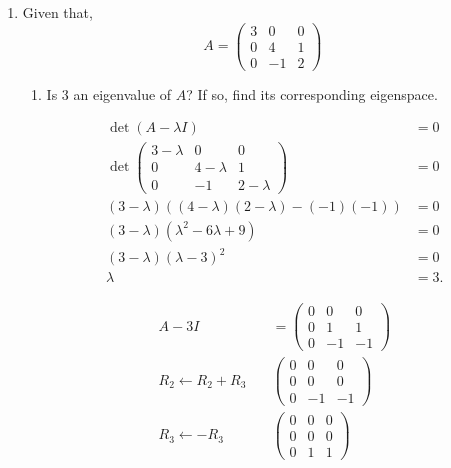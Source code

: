 \documentclass{zc-ust-hw}
\begin{document}
\maketitle

\begin{enumerate}
  \item Given that,
    \[
      A=\begin{pmatrix} 3&0&0\\0&4&1\\0&-1&2 \end{pmatrix} 
    \] 
    \begin{enumerate}
      \item Is 3 an eigenvalue of \( A \)? If so, find its corresponding eigenspace.  
        \begin{sol}
          \begin{align}
            \det(A - \lambda I) &= 0 \\
            \det\begin{pmatrix} 3-\lambda & 0 & 0 \\ 0 & 4-\lambda & 1 \\ 0 & -1 & 2-\lambda \end{pmatrix} &= 0 \\
            (3-\lambda)((4-\lambda)(2-\lambda) - (-1)(-1)) &= 0 \\
            (3-\lambda)(\lambda^2 - 6\lambda + 9) &= 0 \\
            (3-\lambda)(\lambda - 3)^2 &= 0 \\
            \lambda &= 3
          .\end{align}
          \end{sol}
          \begin{sol}
          \begin{align}
            A - 3I &= \begin{pmatrix} 0 & 0 & 0 \\ 0 & 1 & 1 \\ 0 & -1 & -1 \end{pmatrix} \\
            R_2 \leftarrow R_2 + R_3
            \quad
            &\begin{pmatrix} 0 & 0 & 0 \\ 0 & 0 & 0 \\ 0 & -1 & -1 \end{pmatrix} \\
            R_3 \leftarrow -R_3
            \quad
            &\begin{pmatrix} 0 & 0 & 0 \\ 0 & 0 & 0 \\ 0 & 1 & 1 \end{pmatrix} \\

\end{align}
\end{sol}
\end{enumerate}
\end{enumerate}
\end{document}
